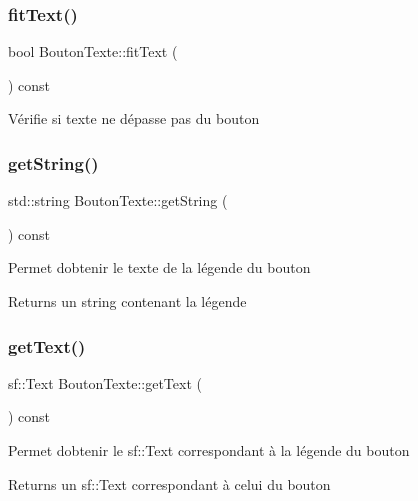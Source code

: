 \subsubsection{\texorpdfstring{fit\+Text()}{fitText()}}
{\footnotesize\ttfamily bool Bouton\+Texte\+::fit\+Text (\begin{DoxyParamCaption}{ }\end{DoxyParamCaption}) const\hspace{0.3cm}{\ttfamily [protected]}}

Vérifie si texte ne dépasse pas du bouton \mbox{\label{classBoutonTexte_a621710e92704902ac505a89a9d1ef67b}} 
\subsubsection{\texorpdfstring{get\+String()}{getString()}}
{\footnotesize\ttfamily std\+::string Bouton\+Texte\+::get\+String (\begin{DoxyParamCaption}{ }\end{DoxyParamCaption}) const}

Permet d\textquotesingle{}obtenir le texte de la légende du bouton \begin{DoxyReturn}{Returns}
un string contenant la légende 
\end{DoxyReturn}
\mbox{\label{classBoutonTexte_a426af0b13653bc55cb4652ce4d1fe985}} 
\subsubsection{\texorpdfstring{get\+Text()}{getText()}}
{\footnotesize\ttfamily sf\+::\+Text Bouton\+Texte\+::get\+Text (\begin{DoxyParamCaption}{ }\end{DoxyParamCaption}) const}

Permet d\textquotesingle{}obtenir le sf\+::\+Text correspondant à la légende du bouton \begin{DoxyReturn}{Returns}
un sf\+::\+Text correspondant à celui du bouton 
\end{DoxyReturn}
\mbox{\label{classBoutonTexte_afcaf8ea6421d4ded5cee30739553c17e}} 
